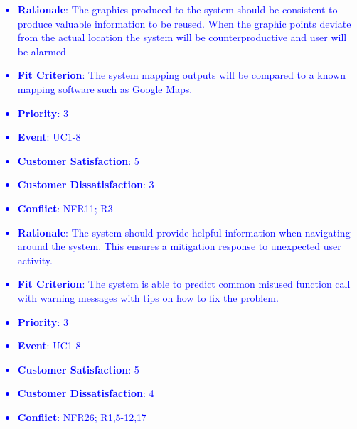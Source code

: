 \documentclass[12pt, titlepage]{article}
\newcounter{reqnum} %
\newcounter{freqnum} %
\begin{document}
\begin{itemize}
\textcolor{blue}{
\item[NFR\refstepcounter{freqnum}\thefreqnum
\label{NFR}:] 
\begin{itemize}
    \item \textbf{Rationale}: The graphics produced to the system should be consistent to produce valuable information to be reused. When the graphic points deviate from the actual location the system will
be counterproductive and user will be alarmed
    \item \textbf{Fit Criterion}: The system mapping outputs will be compared to a known mapping software such as Google Maps. 
    \item \textbf{Priority}: 3
    \item \textbf{Event}: UC1-8%
    \item \textbf{Customer Satisfaction}: 5
    \item \textbf{Customer Dissatisfaction}: 3
    \item \textbf{Conflict}: \textcolor{blue}{NFR11; R3}
\end{itemize}
}
\textcolor{blue}{
\item[NFR\refstepcounter{freqnum}\thefreqnum
\label{NFR}:] 
\begin{itemize}
    \item \textbf{Rationale}: The system should provide helpful information when navigating around the system.
This ensures a mitigation response to unexpected user activity.
    \item \textbf{Fit Criterion}: The system is able to predict common misused function call with warning messages with tips on how to fix the problem.
    \item \textbf{Priority}: 3
    \item \textbf{Event}: UC1-8%
    \item \textbf{Customer Satisfaction}: 5
    \item \textbf{Customer Dissatisfaction}: 4
    \item \textbf{Conflict}: \textcolor{blue}{NFR26; R1,5-12,17}
\end{itemize}
}
\textcolor{blue}{
\item[NFR\refstepcounter{freqnum}\thefreqnum
\label{NFR}:] 
\begin{itemize}

\end{itemize}}
\end{itemize}
\end{document}
